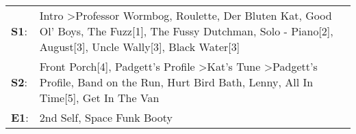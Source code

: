 \begin{supertabular}{p{0.03\textwidth}p{0.92\textwidth}}
 \textbf{S1}:  &  Intro\textsuperscript{} \textgreater \enspace Professor Wormbog\textsuperscript{}, \enspace Roulette\textsuperscript{}, \enspace Der Bluten Kat\textsuperscript{}, \enspace Good Ol' Boys\textsuperscript{}, \enspace The Fuzz[1]\textsuperscript{}, \enspace The Fussy Dutchman\textsuperscript{}, \enspace Solo - Piano[2]\textsuperscript{}, \enspace August[3]\textsuperscript{}, \enspace Uncle Wally[3]\textsuperscript{}, \enspace Black Water[3]\textsuperscript{}  \enspace  \\
 \textbf{S2}:  &                                                                  Front Porch[4]\textsuperscript{}, \enspace Padgett's Profile\textsuperscript{} \textgreater \enspace Kat's Tune\textsuperscript{} \textgreater \enspace Padgett's Profile\textsuperscript{}, \enspace Band on the Run\textsuperscript{}, \enspace Hurt Bird Bath\textsuperscript{}, \enspace Lenny\textsuperscript{}, \enspace All In Time[5]\textsuperscript{}, \enspace Get In The Van\textsuperscript{}  \enspace  \\
 \textbf{E1}:  &                                                                                                                                                                                                                                                                                                                                                                                                     2nd Self\textsuperscript{}, \enspace Space Funk Booty\textsuperscript{}  \enspace  \\
\end{supertabular}
